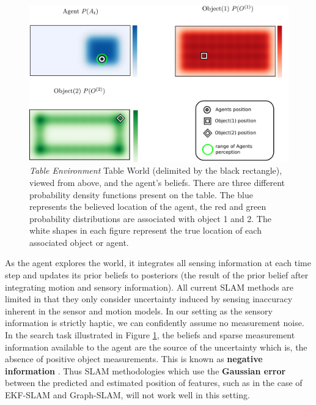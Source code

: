 \begin{figure}
  \centering
  \includegraphics[width=0.95\linewidth]{./ch5-MLMF/Figures/Figure1_v2.pdf}
  \caption{ \textit{Table Environment} Table World (delimited by the black rectangle), viewed from above, and the agent's beliefs. 
  There are three different probability density functions present on the table. 
  The blue represents the believed location of the agent, the red and green probability distributions are associated with object 1 and 2.
  The white shapes in each figure represent the true location of each associated object or agent.}
  \label{fig:Figure1}
\end{figure}
\vspace*{0.6cm}

As the agent explores the world, it integrates all sensing information at each time step and updates its prior beliefs to posteriors
(the result of the prior belief after integrating motion and sensory information).
All current SLAM methods are limited in that they only consider uncertainty induced by sensing inaccuracy inherent in 
the sensor and motion models. In our setting as the sensory information is strictly haptic, we can confidently assume no measurement noise. 
In the search task illustrated in Figure \ref{fig:Figure1}, the beliefs and sparse measurement information available to the agent are 
the source of the uncertainty which is, the absence of positive object measurements. 
This is known as \textbf{negative information} \cite[p.313]{Thrun_Burgard_Fox_2005} \cite{Thrun02particlefilters,negative_info_markov_localisation}. 
Thus SLAM methodologies which use the \textbf{Gaussian error} between the predicted and estimated position of features, such as in the case 
of EKF-SLAM and Graph-SLAM, will not work well in this setting. 

